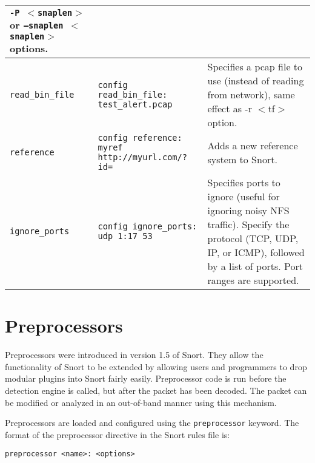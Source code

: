 \documentclass[english]{report}
\newenvironment{note}{
\samepage
    \vspace{10pt}{\textsf{
        {\hspace{7pt}\Huge{$\triangle$\hspace{-12.5pt}{\Large{$^!$}}}}\hspace{5pt}
        {\Large{NOTE}}
    }
    }
   \begin{center}
    \par\vspace{-17pt}

    \begin{lrbox}{\savepar}
    \begin{minipage}[r]{6in}
}
{
    \end{minipage}
    \end{lrbox}
    \fbox{
        \usebox{
            \savepar
	}
    }
    \par\vskip10pt
    \end{center}
}
\newenvironment{note}{
        \begin{rawhtml}
        <p><table border="1"><tr><td><b>
        Note:&nbsp;&nbsp;</b>
        \end{rawhtml}
}{
        \begin{rawhtml}
        </b></td></tr></table></p>
        \end{rawhtml}
}
\begin{document}
\begin{center}
\begin{longtable}{| p{2in} | p{2.25in} | p{2.25in} |}
\texttt{-P $<$snaplen$>$} or \texttt{--snaplen $<$snaplen$>$} options.\\
\hline
\texttt{read\_bin\_file} & \texttt{config read\_bin\_file: test\_alert.pcap} & Specifies a pcap file to use 
(instead of reading from network),
        same effect as -r $<$tf$>$ option.\\
\hline
\texttt{reference} & \texttt{config reference: myref http://myurl.com/?id=} & Adds a new reference system to Snort.  \\
\hline
\texttt{ignore\_ports} & \texttt{config ignore\_ports: udp 1:17 53} & Specifies ports to ignore (useful for ignoring noisy NFS traffic). Specify the protocol (TCP, UDP, IP, or ICMP), followed by a list of ports. Port ranges are supported.\\
\hline
\end{longtable}
\end{center}


\newpage
\section{Preprocessors}

Preprocessors were introduced in version 1.5 of Snort. They allow
the functionality of Snort to be extended by allowing users and programmers
to drop modular plugins into Snort fairly easily.
Preprocessor code is run before the detection engine is called, but
after the packet has been decoded. The packet can be modified or analyzed
in an out-of-band manner using this mechanism.

Preprocessors are loaded and configured using the {\tt preprocessor} keyword.
The format of the preprocessor directive in the Snort rules file is:

\begin{verbatim}
preprocessor <name>: <options>
\end{verbatim}
\end{document}
